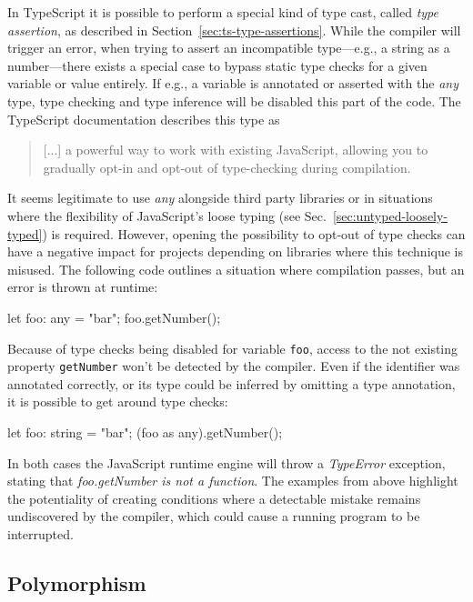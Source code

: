 In TypeScript it is possible to perform a special kind of type cast, called \emph{type assertion}, as described in Section~\ref{sec:ts-type-assertions}. While the compiler will trigger an error, when trying to assert an incompatible type---e.g.,  a string as a number---there exists a special case to bypass static type checks for a given variable or value entirely. If e.g., a variable is annotated or asserted with the \emph{any} type, type checking and type inference will be disabled this part of the code. The TypeScript documentation describes this type as 
\begin{quote}
   [...] a powerful way to work with existing JavaScript, allowing you to gradually opt-in and opt-out of type-checking during compilation.~\cite{TypeScriptHandbook:BasicTypes}
\end{quote}
It seems legitimate to use \emph{any} alongside third party libraries or in situations where the flexibility of JavaScript's loose typing (see Sec.~\ref{sec:untyped-loosely-typed}) is required. However, opening the possibility to opt-out of type checks can have a negative impact for projects depending on libraries where this technique is misused. The following code outlines a situation where compilation passes, but an error is thrown at runtime:
\begin{JsCode}[numbers=none]
let foo: any = "bar";
foo.getNumber();
\end{JsCode}
Because of type checks being disabled for variable \texttt{foo}, access to the not existing property \texttt{getNumber} won't be detected by the compiler. Even if the identifier was annotated correctly, or its type could be inferred by omitting a type annotation, it is possible to get around type checks:
\begin{JsCode}[numbers=none]
let foo: string = "bar";
(foo as any).getNumber();
\end{JsCode}
In both cases the JavaScript runtime engine will throw a \emph{TypeError} exception, stating that \emph{foo.getNumber is not a function}. The examples from above highlight the potentiality of creating conditions where a detectable mistake remains undiscovered by the compiler, which could cause a running program to be interrupted.

\subsection{Polymorphism}

